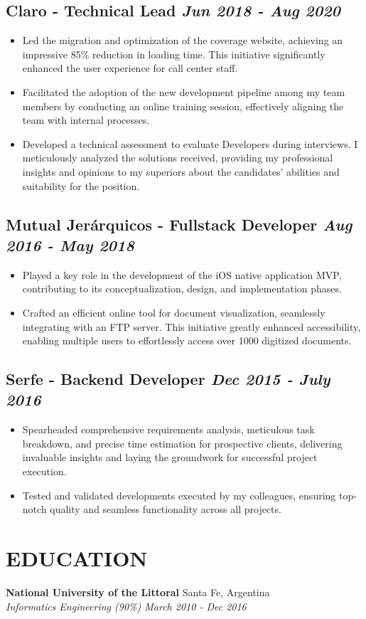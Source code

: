 \documentclass[10pt, a4paper]{article}
\begin{document}
\subsection*{Claro - Technical Lead \hfill \small \textit{Jun 2018 - Aug 2020}}
\begin{itemize}
    \setlength\itemsep{0em}
    \item Led the migration and optimization of the coverage website, achieving an impressive 85\% reduction in loading time. This initiative significantly enhanced the user experience for call center staff.
    \item Facilitated the adoption of the new development pipeline among my team members by conducting an online training session, effectively aligning the team with internal processes.
    \item Developed a technical assessment to evaluate Developers during interviews. I meticulously analyzed the solutions received, providing my professional insights and opinions to my superiors about the candidates' abilities and suitability for the position. 
\end{itemize}

\subsection*{Mutual Jer\'arquicos - Fullstack Developer \hfill \small \textit{Aug 2016 - May 2018}}
\begin{itemize}
    \setlength\itemsep{0em}
    \item Played a key role in the development of the iOS native application MVP, contributing to its conceptualization, design, and implementation phases.
    \item Crafted an efficient online tool for document visualization, seamlessly integrating with an FTP server. This initiative greatly enhanced accessibility, enabling multiple users to effortlessly access over 1000 digitized documents.
\end{itemize}

\subsection*{Serfe - Backend Developer \hfill \small \textit{Dec 2015 - July 2016}}
\begin{itemize}
    \setlength\itemsep{0em}
    \item Spearheaded comprehensive requirements analysis, meticulous task breakdown, and precise time estimation for prospective clients, delivering invaluable insights and laying the groundwork for successful project execution.
    \item Tested and validated developments executed by my colleagues, ensuring top-notch quality and seamless functionality across all projects.
\end{itemize}

\section{EDUCATION}

\textbf{National University of the Littoral} \hfill Santa Fe, Argentina \\
\textit{Informatics Engineering (90\%) \hfill March 2010 - Dec 2016} 
\end{document}
